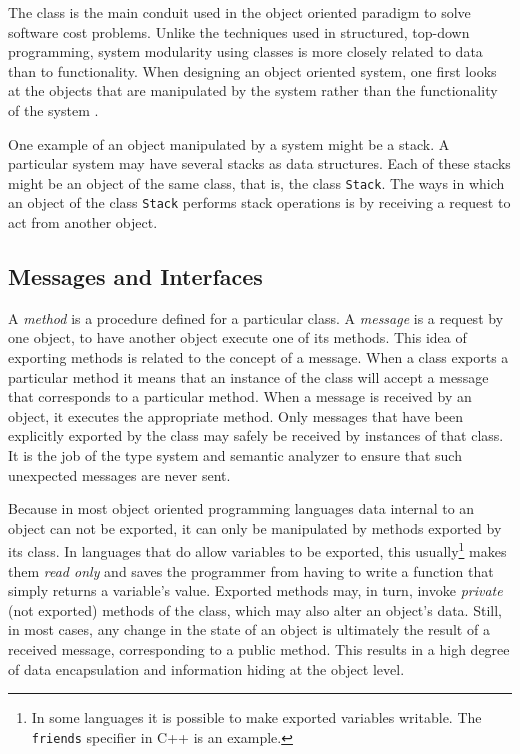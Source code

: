 The class is the main conduit used in the object oriented paradigm to
solve software cost problems.  Unlike the techniques used in
structured, top-down programming, system modularity using classes is
more closely related to data than to functionality.  When designing an
object oriented system, one first looks at the objects that are
manipulated by the system rather than the functionality of the system
\cite{Meyer88}. 

One example of an object manipulated by a system might be a stack.  A
particular system may have several stacks as data structures.  Each of
these stacks might be an object of the same class, that is, the class
{\tt Stack}.  The ways in which an object of the class {\tt Stack}
performs stack operations is by receiving a request to act from
another object.

\subsection{Messages and Interfaces}

A {\em method} is a procedure defined for a particular class.  A {\em
message} is a request by one object, to have another object execute
one of its methods.  This idea of exporting methods is related to the
concept of a message.  When a class exports a particular method it
means that an instance of the class will accept a message that
corresponds to a particular method.  When a message is received by an
object, it executes the appropriate method.  Only messages that have
been explicitly exported by the class may safely be received by
instances of that class.  It is the job of the type system and
semantic analyzer to ensure that such unexpected messages are never
sent.

Because in most object oriented programming languages data internal to
an object can not be exported, it can only be manipulated by methods
exported by its class.  In languages that do allow variables to be
exported, this usually\footnote{In some languages it is possible to
make exported variables writable.  The {\tt friends} specifier in C++
is an example.} makes them {\em read only} and saves the programmer
from having to write a function that simply returns a variable's
value. Exported methods may, in turn, invoke {\em private} (not
exported) methods of the class, which may also alter an object's data.
Still, in most cases, any change in the state of an object is
ultimately the result of a received message, corresponding to a public
method.  This results in a high degree of data encapsulation and
information hiding at the object level.

